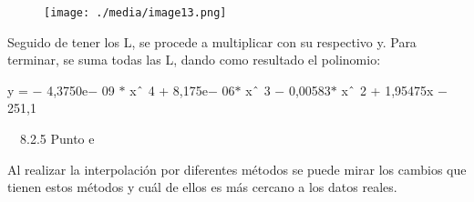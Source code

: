 \documentclass[12pt]{article}
\renewcommand{\_}{\kern-1.5pt\textunderscore\kern-1.5pt}
\begin{document}

\par




\begin{figure}[H]
	\begin{Center}
		\texttt{[image: ./media/image13.png]}
	\end{Center}
\end{figure}



\par


\vspace{\baselineskip}

\vspace{\baselineskip}
\begin{adjustwidth}{0.49in}{0.0in}
Seguido de tener los L, se procede a multiplicar con su respectivo y. Para terminar, se suma todas las L, dando como resultado el polinomio:\par

\end{adjustwidth}


\vspace{\baselineskip}
\begin{adjustwidth}{0.49in}{0.0in}
y = $-$ 4,3750e$-$ 09 $\ast$ x$ \string^ $ 4 + 8,175e$-$ 06$\ast$  x$ \string^ $ 3 $-$  0,00583$\ast$  x$ \string^ $ 2 + 1,95475x $-$  251,1\par

\end{adjustwidth}


\vspace{\baselineskip}
\begin{adjustwidth}{0.49in}{0.0in}
\ \  8.2.5 Punto e\par

\end{adjustwidth}

\begin{adjustwidth}{0.49in}{0.0in}
\tab Al realizar la interpolación por diferentes métodos se puede mirar los cambios que tienen estos métodos y cuál de ellos es más cercano a los datos reales.\par

\end{adjustwidth}
\end{document}
